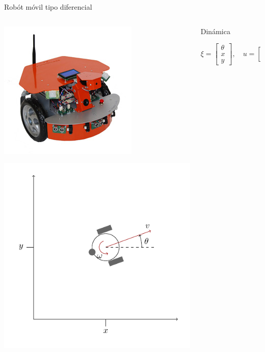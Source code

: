 \documentclass[presentation,aspectratio=169]{beamer}
\begin{document}
\begin{frame}[label={sec:orgdaed7db}]{Robót móvil tipo diferencial}
\begin{columns}
\begin{column}{0.4\columnwidth}
\begin{center}
 \includegraphics[width=.3\linewidth]{../figures/X80Pro.jpg}
\end{center}
\begin{center}
 \includegraphics[width=1.0\linewidth]{../figures/unicycle-model}
\end{center}
\end{column}

\begin{column}{0.6\columnwidth}
\pause

\alert{Dinámica}

\[ \xi = \begin{bmatrix} \theta\\x\\y \end{bmatrix},   \quad u = \begin{bmatrix} \omega\\v \end{bmatrix}\]




\end{column}
\end{columns}
\end{frame}
\end{document}
